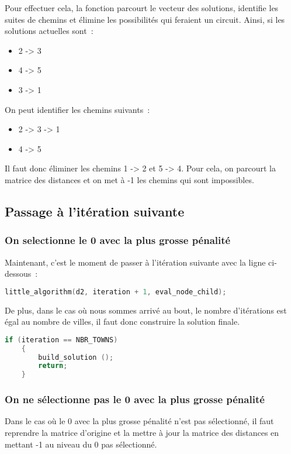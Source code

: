 \documentclass[11pt]{article}
\begin{document}
Pour effectuer cela, la fonction parcourt le vecteur des solutions, identifie les suites de chemins et élimine les possibilités qui feraient un circuit. 
Ainsi, si les solutions actuelles sont : 
\begin{itemize}
    \item 2 -> 3
    \item 4 -> 5
    \item 3 -> 1
\end{itemize}

On peut identifier les chemins suivants :
\begin{itemize}
    \item 2 -> 3 -> 1
    \item 4 -> 5
\end{itemize}

Il faut donc éliminer les chemins 1 -> 2 et 5 -> 4. Pour cela, on parcourt la matrice des distances et on met à -1 les chemins qui sont impossibles.

\subsection{Passage à l'itération suivante}

\subsubsection{On selectionne le 0 avec la plus grosse pénalité}

Maintenant, c'est le moment de passer à l'itération suivante avec la ligne ci-dessous :
\begin{lstlisting}[language=C]
    little_algorithm(d2, iteration + 1, eval_node_child);
\end{lstlisting}

De plus, dans le cas où nous sommes arrivé au bout, le nombre d'itérations est égal au nombre de villes, il faut donc construire la solution finale.

\begin{lstlisting}[language=C]
    if (iteration == NBR_TOWNS)
    {
        build_solution ();
        return;
    }
\end{lstlisting}

\subsubsection{On ne sélectionne pas le 0 avec la plus grosse pénalité}

Dans le cas où le 0 avec la plus grosse pénalité n'est pas sélectionné, il faut reprendre la matrice d'origine et la mettre à jour la matrice des distances en mettant -1 au niveau du 0 pas sélectionné.
\end{document}
